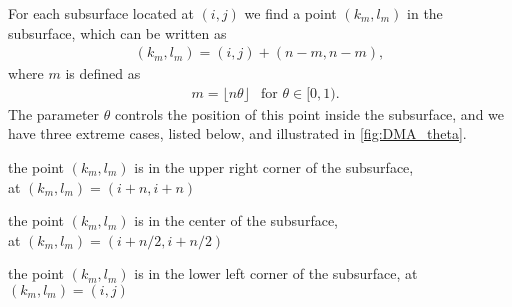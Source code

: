 For each subsurface located at $(i,j)$ we find a point $(k_m, l_m)$ in the subsurface, which can be written as
\begin{align}
    (k_m, l_m) = (i,j) + (n-m, n-m), %
    \label{eq:dma_point_in_subsurface}
\end{align}
where $m$ is defined as
\begin{align*}
    &m = \lfloor n\theta \rfloor &\text{for } \theta \in [0,1).
\end{align*}
The parameter $\theta$ controls the position of this point inside the subsurface, and we have three extreme cases, listed below, and illustrated in \cref{fig:DMA_theta}.%
%
\begin{description}[%
    labelindent=\oldparindent,%
    leftmargin=2.0\oldparindent%
]%
    \item[$\bm{\theta = 0}$:] the point $(k_m, l_m)$ is in the upper right corner of the subsurface, \\at ${(k_m, l_m) = (i+n,i+n)}$
    \item[$\bm{\theta = 1/2}$:] the point $(k_m, l_m)$ is in the center of the subsurface, \\at ${(k_m, l_m) = (i+n/2, i+n/2)}$
    \item[$\bm{\theta \rightarrow 1 \rightarrow (n-1)/n}$:] the point $(k_m, l_m)$ is in the lower left corner of the subsurface, at ${(k_m, l_m) = (i,j)}$
\end{description}%
%
